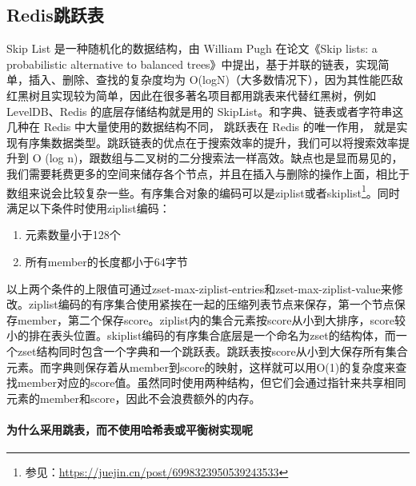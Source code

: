 \documentclass[../../../interview-questions.tex]{subfiles}
\begin{document}
\subsection{Redis跳跃表}

Skip List 是一种随机化的数据结构，由 William Pugh 在论文《Skip lists: a probabilistic alternative to balanced trees》中提出，基于并联的链表，实现简单，插入、删除、查找的复杂度均为 O(logN)（大多数情况下），因为其性能匹敌红黑树且实现较为简单，因此在很多著名项目都用跳表来代替红黑树，例如 LevelDB、Redis 的底层存储结构就是用的 SkipList。和字典、链表或者字符串这几种在 Redis 中大量使用的数据结构不同， 跳跃表在 Redis 的唯一作用， 就是实现有序集数据类型。跳跃链表的优点在于搜索效率的提升，我们可以将搜索效率提升到 O (log n)，跟数组与二叉树的二分搜索法一样高效。缺点也是显而易见的，我们需要耗费更多的空间来储存各个节点，并且在插入与删除的操作上面，相比于数组来说会比较复杂一些。有序集合对象的编码可以是ziplist或者skiplist\footnote{参见：\url{https://juejin.cn/post/6998323950539243533}}。同时满足以下条件时使用ziplist编码：

\begin{enumerate}
    \item {元素数量小于128个}
    \item {所有member的长度都小于64字节}
\end{enumerate}

以上两个条件的上限值可通过zset-max-ziplist-entries和zset-max-ziplist-value来修改。ziplist编码的有序集合使用紧挨在一起的压缩列表节点来保存，第一个节点保存member，第二个保存score。ziplist内的集合元素按score从小到大排序，score较小的排在表头位置。skiplist编码的有序集合底层是一个命名为zset的结构体，而一个zset结构同时包含一个字典和一个跳跃表。跳跃表按score从小到大保存所有集合元素。而字典则保存着从member到score的映射，这样就可以用O(1)的复杂度来查找member对应的score值。虽然同时使用两种结构，但它们会通过指针来共享相同元素的member和score，因此不会浪费额外的内存。

\paragraph{为什么采用跳表，而不使用哈希表或平衡树实现呢}
\end{document}
